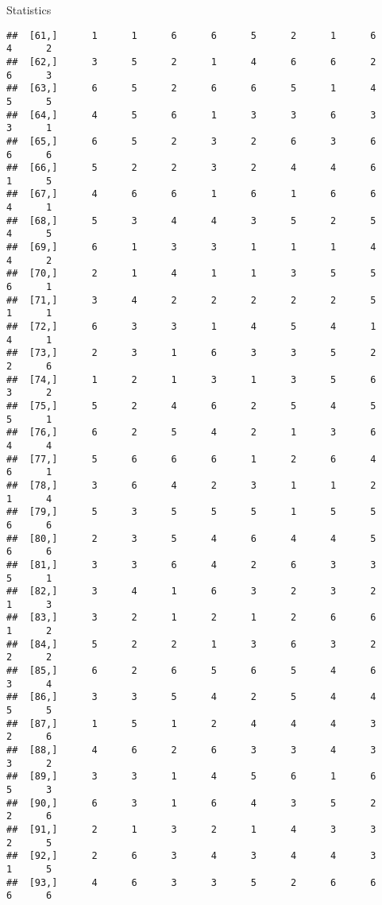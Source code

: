 \documentclass[
  ignorenonframetext,
]{beamer}
\begin{document}
\begin{frame}[fragile]{Statistics}
\begin{verbatim}
##  [61,]      1      1      6      6      5      2      1      6      4      2
##  [62,]      3      5      2      1      4      6      6      2      6      3
##  [63,]      6      5      2      6      6      5      1      4      5      5
##  [64,]      4      5      6      1      3      3      6      3      3      1
##  [65,]      6      5      2      3      2      6      3      6      6      6
##  [66,]      5      2      2      3      2      4      4      6      1      5
##  [67,]      4      6      6      1      6      1      6      6      4      1
##  [68,]      5      3      4      4      3      5      2      5      4      5
##  [69,]      6      1      3      3      1      1      1      4      4      2
##  [70,]      2      1      4      1      1      3      5      5      6      1
##  [71,]      3      4      2      2      2      2      2      5      1      1
##  [72,]      6      3      3      1      4      5      4      1      4      1
##  [73,]      2      3      1      6      3      3      5      2      2      6
##  [74,]      1      2      1      3      1      3      5      6      3      2
##  [75,]      5      2      4      6      2      5      4      5      5      1
##  [76,]      6      2      5      4      2      1      3      6      4      4
##  [77,]      5      6      6      6      1      2      6      4      6      1
##  [78,]      3      6      4      2      3      1      1      2      1      4
##  [79,]      5      3      5      5      5      1      5      5      6      6
##  [80,]      2      3      5      4      6      4      4      5      6      6
##  [81,]      3      3      6      4      2      6      3      3      5      1
##  [82,]      3      4      1      6      3      2      3      2      1      3
##  [83,]      3      2      1      2      1      2      6      6      1      2
##  [84,]      5      2      2      1      3      6      3      2      2      2
##  [85,]      6      2      6      5      6      5      4      6      3      4
##  [86,]      3      3      5      4      2      5      4      4      5      5
##  [87,]      1      5      1      2      4      4      4      3      2      6
##  [88,]      4      6      2      6      3      3      4      3      3      2
##  [89,]      3      3      1      4      5      6      1      6      5      3
##  [90,]      6      3      1      6      4      3      5      2      2      6
##  [91,]      2      1      3      2      1      4      3      3      2      5
##  [92,]      2      6      3      4      3      4      4      3      1      5
##  [93,]      4      6      3      3      5      2      6      6      6      6

\end{verbatim}
\end{frame}
\end{document}
